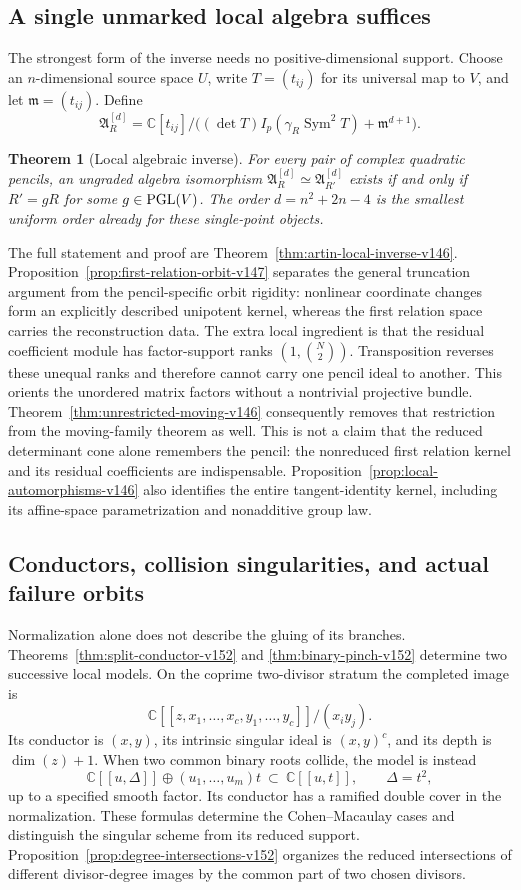 \documentclass[11pt,reqno]{amsart}
\numberwithin{equation}{section}
\newtheorem{theorem}{Theorem}[section]
\theoremstyle{definition}\newtheorem{definition}[theorem]{Definition}
\theoremstyle{remark}\newtheorem{remark}[theorem]{Remark}
\newcommand{\C}{\mathbb C}\newcommand{\Q}{\mathbb Q}
\DeclareMathOperator{\Sym}{Sym}\DeclareMathOperator{\Gr}{Gr}
\begin{document}
\subsection{A single unmarked local algebra suffices}
The strongest form of the inverse needs no positive-dimensional support.
Choose an \(n\)-dimensional source space \(U\), write \(T=(t_{ij})\)
for its universal map to \(V\), and let \(\mathfrak m=(t_{ij})\).
Define
\[
 \mathfrak A_R^{[d]}=
 \C[t_{ij}]/\bigl((\det T)I_p(\gamma_R\Sym^2T)
                                      +\mathfrak m^{d+1}\bigr).
\]
\begin{theorem}[Local algebraic inverse]\label{thm:principal-local-v146}
For every pair of complex quadratic pencils, an ungraded algebra
isomorphism \(\mathfrak A_R^{[d]}\simeq\mathfrak A_{R'}^{[d]}\)
exists if and only if \(R'=gR\) for some \(g\in\operatorname{PGL}(V)\).
The order \(d=n^2+2n-4\) is the smallest uniform order already for
these single-point objects.
\end{theorem}
The full statement and proof are
Theorem~\ref{thm:artin-local-inverse-v146}.  Proposition~\ref{prop:first-relation-orbit-v147}
separates the general truncation argument from the pencil-specific
orbit rigidity: nonlinear coordinate changes form an explicitly described
unipotent kernel, whereas the first relation space carries the
reconstruction data.  The extra local ingredient
is that the residual coefficient module has factor-support ranks
\((1,\binom N2)\).  Transposition reverses these unequal ranks and
therefore cannot carry one pencil ideal to another.  This orients the
unordered matrix factors without a nontrivial projective bundle.
Theorem~\ref{thm:unrestricted-moving-v146} consequently removes that
restriction from the moving-family theorem as well.  This is not a
claim that the reduced determinant cone alone remembers the pencil:
the nonreduced first relation kernel and its residual coefficients
are indispensable.  Proposition~\ref{prop:local-automorphisms-v146}
also identifies the entire tangent-identity kernel, including its
affine-space parametrization and nonadditive group law.

\subsection{Conductors, collision singularities, and actual failure orbits}
Normalization alone does not describe the gluing of its branches.
Theorems~\ref{thm:split-conductor-v152} and
\ref{thm:binary-pinch-v152} determine two successive local models.
On the coprime two-divisor stratum the completed image is
\[
       \C[[z,x_1,\ldots,x_c,y_1,\ldots,y_c]]/(x_i y_j).
\]
Its conductor is $(x,y)$, its intrinsic singular ideal is $(x,y)^c$,
and its depth is $\dim(z)+1$.  When two common binary roots collide,
the model is instead
\[
 \C[[u,\Delta]]\oplus(u_1,\ldots,u_m)t
          \ \subset\ \C[[u,t]],\qquad \Delta=t^2,
\]
up to a specified smooth factor.  Its conductor has a ramified
double cover in the normalization.  These formulas determine the
Cohen--Macaulay cases and distinguish the singular scheme from its
reduced support.  Proposition~\ref{prop:degree-intersections-v152}
organizes the reduced intersections of different divisor-degree
images by the common part of two chosen divisors.
\end{document}
